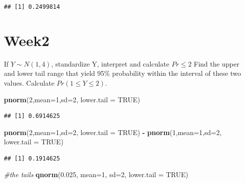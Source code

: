 \documentclass[
]{book}
\newenvironment{Shaded}{\begin{snugshade}}{\end{snugshade}}
\newcommand{\CommentTok}[1]{\textcolor[rgb]{0.56,0.35,0.01}{\textit{#1}}}
\newcommand{\DataTypeTok}[1]{\textcolor[rgb]{0.13,0.29,0.53}{#1}}
\newcommand{\DecValTok}[1]{\textcolor[rgb]{0.00,0.00,0.81}{#1}}
\newcommand{\FloatTok}[1]{\textcolor[rgb]{0.00,0.00,0.81}{#1}}
\newcommand{\KeywordTok}[1]{\textcolor[rgb]{0.13,0.29,0.53}{\textbf{#1}}}
\newcommand{\NormalTok}[1]{#1}
\newcommand{\OperatorTok}[1]{\textcolor[rgb]{0.81,0.36,0.00}{\textbf{#1}}}
\newcommand{\OtherTok}[1]{\textcolor[rgb]{0.56,0.35,0.01}{#1}}
\newcommand{\StringTok}[1]{\textcolor[rgb]{0.31,0.60,0.02}{#1}}
\begin{document}
\begin{verbatim}
## [1] 0.2499814
\end{verbatim}

\hypertarget{week2}{%
\section{Week2}\label{week2}}

If \(Y \sim N(1,4)\), standardize Y, interpret and calculate \(Pr \leq 2\) Find the upper and lower tail range that yield 95\% probability within the interval of these two values. Calculate \(Pr(1\leq Y \leq 2)\).

\begin{Shaded}
\begin{Highlighting}[]
\KeywordTok{pnorm}\NormalTok{(}\DecValTok{2}\NormalTok{,}\DataTypeTok{mean=}\DecValTok{1}\NormalTok{,}\DataTypeTok{sd=}\DecValTok{2}\NormalTok{, }\DataTypeTok{lower.tail =} \OtherTok{TRUE}\NormalTok{)}
\end{Highlighting}
\end{Shaded}

\begin{verbatim}
## [1] 0.6914625
\end{verbatim}

\begin{Shaded}
\begin{Highlighting}[]
\KeywordTok{pnorm}\NormalTok{(}\DecValTok{2}\NormalTok{,}\DataTypeTok{mean=}\DecValTok{1}\NormalTok{,}\DataTypeTok{sd=}\DecValTok{2}\NormalTok{, }\DataTypeTok{lower.tail =} \OtherTok{TRUE}\NormalTok{) }\OperatorTok{-}\StringTok{ }\KeywordTok{pnorm}\NormalTok{(}\DecValTok{1}\NormalTok{,}\DataTypeTok{mean=}\DecValTok{1}\NormalTok{,}\DataTypeTok{sd=}\DecValTok{2}\NormalTok{, }\DataTypeTok{lower.tail =} \OtherTok{TRUE}\NormalTok{)}
\end{Highlighting}
\end{Shaded}

\begin{verbatim}
## [1] 0.1914625
\end{verbatim}

\begin{Shaded}
\begin{Highlighting}[]
\CommentTok{#the tails }
\KeywordTok{qnorm}\NormalTok{(}\FloatTok{0.025}\NormalTok{, }\DataTypeTok{mean=}\DecValTok{1}\NormalTok{, }\DataTypeTok{sd=}\DecValTok{2}\NormalTok{, }\DataTypeTok{lower.tail =} \OtherTok{TRUE}\NormalTok{)}
\end{Highlighting}
\end{Shaded}
\end{document}
